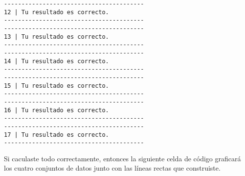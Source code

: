 \documentclass[
  letterpaper,
  DIV=11,
  numbers=noendperiod]{scrreprt}
\begin{document}
\begin{verbatim}
----------------------------------------
12 | Tu resultado es correcto.
----------------------------------------
----------------------------------------
13 | Tu resultado es correcto.
----------------------------------------
----------------------------------------
14 | Tu resultado es correcto.
----------------------------------------
----------------------------------------
15 | Tu resultado es correcto.
----------------------------------------
----------------------------------------
16 | Tu resultado es correcto.
----------------------------------------
----------------------------------------
17 | Tu resultado es correcto.
----------------------------------------
\end{verbatim}

Si caculaste todo correctamente, entonces la siguiente celda de código
graficará los cuatro conjuntos de datos junto con las líneas rectas que
construiste.
\end{document}
